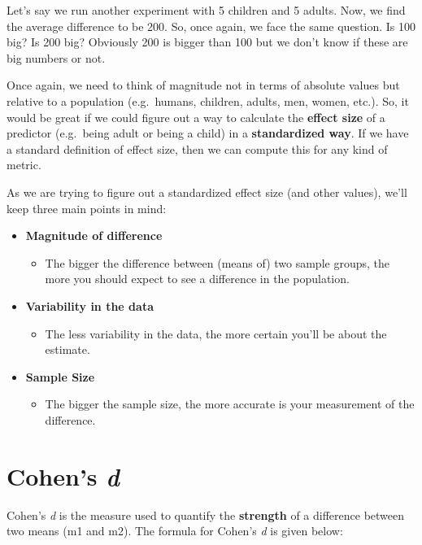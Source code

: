 \documentclass[
]{book}
\providecommand{\tightlist}{%
  \setlength{\itemsep}{0pt}\setlength{\parskip}{0pt}}
\begin{document}
Let's say we run another experiment with 5 children and 5 adults. Now, we find the average difference to be 200. So, once again, we face the same question. Is 100 big? Is 200 big? Obviously 200 is bigger than 100 but we don't know if these are big numbers or not.

Once again, we need to think of magnitude not in terms of absolute values but relative to a population (e.g.~humans, children, adults, men, women, etc.). So, it would be great if we could figure out a way to calculate the \textbf{effect size} of a predictor (e.g.~being adult or being a child) in a \textbf{standardized way}. If we have a standard definition of effect size, then we can compute this for any kind of metric.

As we are trying to figure out a standardized effect size (and other values), we'll keep three main points in mind:

\begin{itemize}
\tightlist
\item
  \textbf{Magnitude of difference}

  \begin{itemize}
  \tightlist
  \item
    The bigger the difference between (means of) two sample groups, the more you should expect to see a difference in the population.
  \end{itemize}
\item
  \textbf{Variability in the data}

  \begin{itemize}
  \tightlist
  \item
    The less variability in the data, the more certain you'll be about the estimate.
  \end{itemize}
\item
  \textbf{Sample Size}

  \begin{itemize}
  \tightlist
  \item
    The bigger the sample size, the more accurate is your measurement of the difference.
  \end{itemize}
\end{itemize}

\section{\texorpdfstring{Cohen's \emph{d}}{Cohen's d}}\label{cohens-d}

Cohen's \emph{d} is the measure used to quantify the \textbf{strength} of a difference between two means (m1 and m2). The formula for Cohen's \emph{d} is given below:
\end{document}
